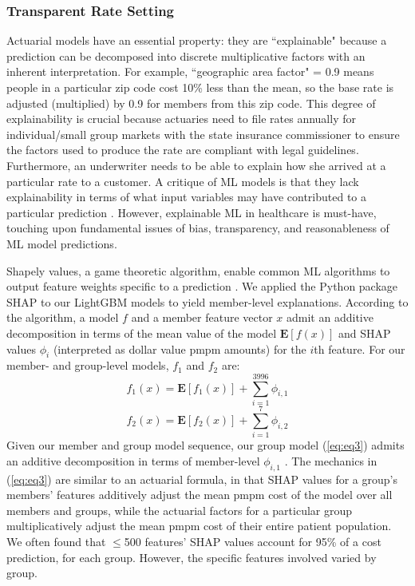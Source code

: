 \documentclass[letterpaper]{article} %
\begin{document}
\subsubsection{Transparent Rate Setting}\label{sec:deployment}
Actuarial models have an essential property: they are ``explainable" because a prediction can be decomposed into discrete multiplicative factors with an inherent interpretation.  For example, ``geographic area factor" = 0.9 means people in a particular zip code cost 10\% less than the mean, so the base rate is adjusted (multiplied) by 0.9 for members from this zip code.  This degree of explainability is crucial because actuaries need to file rates annually for individual/small group markets with the state insurance commissioner to ensure the factors used to produce the rate are compliant with legal guidelines.  Furthermore, an underwriter needs to be able to explain how she arrived at a particular rate to a customer.
A critique of ML models is that they lack explainability in terms of what input variables may have contributed to a particular prediction \cite{xai}.  However, explainable ML in healthcare is must-have, touching upon fundamental issues of bias, transparency, and reasonableness of ML model predictions.

Shapely values, a game theoretic algorithm, enable common ML algorithms to output feature weights specific to a prediction \cite{Shap}.   We applied the Python package SHAP to our LightGBM models to yield member-level explanations.  According to the algorithm, a model $f$ and a member feature vector $x$ admit an additive decomposition in terms of the mean value of the model $\mathbf{E}[f(x)]$ and SHAP values $\phi_{i}$ (interpreted as dollar value pmpm amounts) for the $i$th feature.  For our member- and group-level models, $f_{1}$ and $f_{2}$ are:
\begin{equation}   
{f_{1}(x)} = \mathbf{E}[f_{1}(x)] + \sum_{i=1}^{3996} \phi_{i, 1}
 \label{eq:eq2}
\end{equation}
\begin{equation}   
{f_{2}(x)} = \mathbf{E}[f_{2}(x)] + \sum_{i=1}^{7} \phi_{i, 2}
 \label{eq:eq3}
\end{equation}
Given our member and group model sequence, our group model (\ref{eq:eq3}) admits an additive decomposition in terms of member-level $\phi_{i, 1}$ .  The mechanics in (\ref{eq:eq3}) are similar to an actuarial formula, in that SHAP values for a group's members' features additively adjust the mean pmpm cost of the model over all members and groups, while the actuarial factors for a particular group multiplicatively adjust the mean pmpm cost of their entire patient population.  We often found that $\leq$500 features' SHAP values account for 95\% of a cost prediction, for each group.  However, the specific features involved varied by group.
\end{document}
